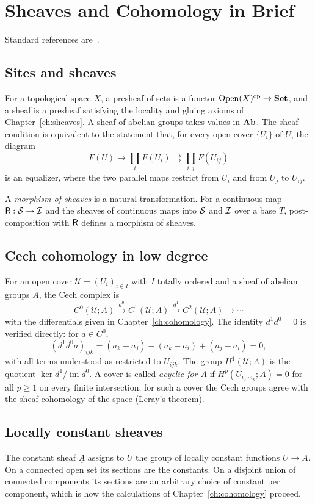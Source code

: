 \chapter{Sheaves and Cohomology in Brief}
\label{app:sheaf}

Standard references are~\cite{maclane1992,bott1982}.

\section*{Sites and sheaves}

For a topological space $X$, a presheaf of sets is a functor $\mathrm{Open}(X)^{\mathrm{op}}\to\mathbf{Set}$, and a sheaf is a presheaf satisfying the locality and gluing axioms of Chapter~\ref{ch:sheaves}. A sheaf of abelian groups takes values in $\mathbf{Ab}$. The sheaf condition is equivalent to the statement that, for every open cover $\{U_i\}$ of $U$, the diagram
\[
F(U)\longrightarrow\prod_iF(U_i)\rightrightarrows\prod_{i,j}F(U_{ij})
\]
is an equalizer, where the two parallel maps restrict from $U_i$ and from $U_j$ to $U_{ij}$.

A \emph{morphism of sheaves} is a natural transformation. For a continuous map $\mathsf{R}:\mathcal{S}\to\mathcal{I}$ and the sheaves of continuous maps into $\mathcal{S}$ and $\mathcal{I}$ over a base $T$, post-composition with $\mathsf{R}$ defines a morphism of sheaves.

\section*{Cech cohomology in low degree}

For an open cover $\mathcal{U}=(U_i)_{i\in I}$ with $I$ totally ordered and a sheaf of abelian groups $A$, the Cech complex is
\[
C^0(\mathcal{U};A)\xrightarrow{d^0}C^1(\mathcal{U};A)\xrightarrow{d^1}C^2(\mathcal{U};A)\to\cdots
\]
with the differentials given in Chapter~\ref{ch:cohomology}. The identity $d^1d^0=0$ is verified directly: for $a\in C^0$,
\[
(d^1d^0a)_{ijk}=(a_k-a_j)-(a_k-a_i)+(a_j-a_i)=0,
\]
with all terms understood as restricted to $U_{ijk}$. The group $H^1(\mathcal{U};A)$ is the quotient $\ker d^1/\operatorname{im}d^0$. A cover is called \emph{acyclic for $A$} if $H^p(U_{i_0\cdots i_k};A)=0$ for all $p\ge1$ on every finite intersection; for such a cover the Cech groups agree with the sheaf cohomology of the space (Leray's theorem).

\section*{Locally constant sheaves}

The constant sheaf $\underline{A}$ assigns to $U$ the group of locally constant functions $U\to A$. On a connected open set its sections are the constants. On a disjoint union of connected components its sections are an arbitrary choice of constant per component, which is how the calculations of Chapter~\ref{ch:cohomology} proceed.
